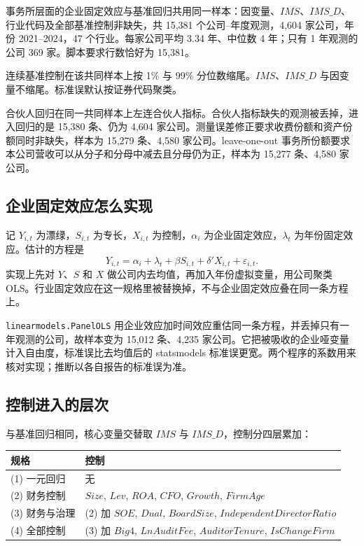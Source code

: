 \documentclass[11pt]{article}
\begin{document}
事务所层面的企业固定效应与基准回归共用同一样本：因变量、\(IMS\)、\(IMS\_D\)、行业代码及全部基准控制非缺失，共 15,381 个公司--年度观测，4,604 家公司，年份 2021--2024，47 个行业。每家公司平均 3.34 年、中位数 4 年；只有 1 年观测的公司 369 家。脚本要求行数恰好为 15,381。

连续基准控制在该共同样本上按 1\% 与 99\% 分位数缩尾。\(IMS\)、\(IMS\_D\) 与因变量不缩尾。标准误默认按证券代码聚类。

合伙人回归在同一共同样本上左连合伙人指标。合伙人指标缺失的观测被丢掉，进入回归的是 15,380 条、仍为 4,604 家公司。测量误差修正要求收费份额和资产份额同时非缺失，样本为 15,279 条、4,580 家公司。leave-one-out 事务所份额要求本公司营收可以从分子和分母中减去且分母仍为正，样本为 15,277 条、4,580 家公司。

\subsection{企业固定效应怎么实现}

记 \(Y_{i,t}\) 为漂绿，\(S_{i,t}\) 为专长，\(X_{i,t}\) 为控制，\(\alpha_i\) 为企业固定效应，\(\lambda_t\) 为年份固定效应。估计的方程是
\begin{equation}
Y_{i,t}=\alpha_i+\lambda_t+\beta S_{i,t}+\delta'X_{i,t}+\varepsilon_{i,t}.
\label{eq:firmfe}
\end{equation}
实现上先对 \(Y\)、\(S\) 和 \(X\) 做公司内去均值，再加入年份虚拟变量，用公司聚类 OLS。行业固定效应在这一规格里被替换掉，不与企业固定效应叠在同一条方程上。

\texttt{linearmodels.PanelOLS} 用企业效应加时间效应重估同一条方程，并丢掉只有一年观测的公司，故样本变为 15,012 条、4,235 家公司。它把被吸收的企业哑变量计入自由度，标准误比去均值后的 statsmodels 标准误更宽。两个程序的系数用来核对实现；推断以各自报告的标准误为准。

\subsection{控制进入的层次}

与基准回归相同，核心变量交替取 \(IMS\) 与 \(IMS\_D\)，控制分四层累加：

\begin{center}
\begin{tabular}{ll}
\toprule
规格 & 控制 \\
\midrule
(1) 一元回归 & 无 \\
(2) 财务控制 & \(Size\), \(Lev\), \(ROA\), \(CFO\), \(Growth\), \(FirmAge\) \\
(3) 财务与治理 & (2) 加 \(SOE\), \(Dual\), \(BoardSize\), \(IndependentDirectorRatio\) \\
(4) 全部控制 & (3) 加 \(Big4\), \(LnAuditFee\), \(AuditorTenure\), \(IsChangeFirm\) \\
\bottomrule
\end{tabular}
\end{center}
\end{document}
